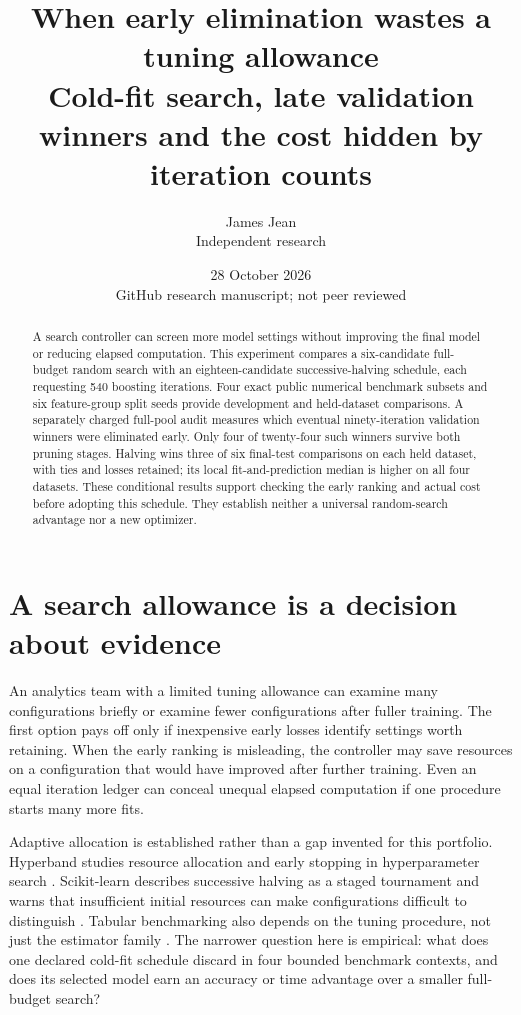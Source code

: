 \documentclass[11pt]{article}
\title{When early elimination wastes a tuning allowance\\\large Cold-fit search, late validation winners and the cost hidden by iteration counts}
\author{James Jean\\Independent research}
\date{28 October 2026\\GitHub research manuscript; not peer reviewed}
\begin{document}
\maketitle
\begin{abstract}
A search controller can screen more model settings without improving the final model or reducing elapsed computation. This experiment compares a six-candidate full-budget random search with an eighteen-candidate successive-halving schedule, each requesting 540 boosting iterations. Four exact public numerical benchmark subsets and six feature-group split seeds provide development and held-dataset comparisons. A separately charged full-pool audit measures which eventual ninety-iteration validation winners were eliminated early. Only four of twenty-four such winners survive both pruning stages. Halving wins three of six final-test comparisons on each held dataset, with ties and losses retained; its local fit-and-prediction median is higher on all four datasets. These conditional results support checking the early ranking and actual cost before adopting this schedule. They establish neither a universal random-search advantage nor a new optimizer.
\end{abstract}
\section{A search allowance is a decision about evidence}
An analytics team with a limited tuning allowance can examine many configurations briefly or examine fewer configurations after fuller training. The first option pays off only if inexpensive early losses identify settings worth retaining. When the early ranking is misleading, the controller may save resources on a configuration that would have improved after further training. Even an equal iteration ledger can conceal unequal elapsed computation if one procedure starts many more fits.

Adaptive allocation is established rather than a gap invented for this portfolio. Hyperband studies resource allocation and early stopping in hyperparameter search \cite{hyperband}. Scikit-learn describes successive halving as a staged tournament and warns that insufficient initial resources can make configurations difficult to distinguish \cite{sklearn}. Tabular benchmarking also depends on the tuning procedure, not just the estimator family \cite{grinsztajn}. The narrower question here is empirical: what does one declared cold-fit schedule discard in four bounded benchmark contexts, and does its selected model earn an accuracy or time advantage over a smaller full-budget search?
\end{document}
